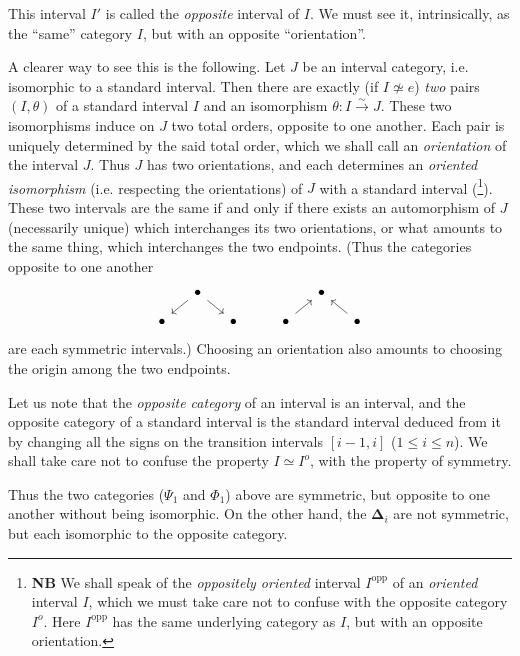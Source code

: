 \documentclass[11pt]{article}
\newcommand{\printedpage}[1]{\marginpar{\footnotesize p.~#1}}
\newcommand{\msp}[1]{\marginpar{\footnotesize [#1]}}
\newcommand{\bD}{\boldsymbol{\Delta}}
\begin{document}
This interval $I'$ is called the \textit{opposite} interval of $I$. We must see it, intrinsically, as the ``same'' category $I$, %
but with an opposite ``orientation''.

\msp{page 8}

A clearer way to see this is the following. Let $J$ be an interval category, i.e. isomorphic to a standard interval. Then there are exactly (if $I \not\simeq e$) \textit{two} pairs $(I,\theta)$ of a standard interval $I$ and an isomorphism $\theta : I \xrightarrow{\sim} J$. These two isomorphisms induce on $J$ two total orders, opposite to one another. Each pair is uniquely determined by the said total order, which we shall call %
an \textit{orientation} of the interval $J$. Thus $J$ has two orientations, and each determines an \textit{oriented isomorphism} (i.e. respecting
\printedpage{5}
the orientations) of $J$ with a standard interval (\footnote[2]{\textbf{NB} We shall speak of the \textit{oppositely oriented} interval $I^{\mathrm{opp}}$ of an \textit{oriented} interval $I$, which we must take care not to confuse with the opposite category $I^o$. Here $I^{\mathrm{opp}}$ has the same underlying category as $I$, but with an opposite orientation.}). These two intervals are the same if and only if there exists an automorphism of $J$ (necessarily unique) which interchanges its two orientations, or what amounts to the same thing, which interchanges the two endpoints. (Thus the categories opposite to one another
\[
\begin{tikzcd}[column sep=small, row sep=small]
 & \bullet \arrow[dl] \arrow[dr] & & & & \bullet & \\
 \bullet & & \bullet & & \bullet \arrow[ur] & & \bullet \arrow[ul]
\end{tikzcd}
\]
are each %
symmetric intervals.) Choosing an orientation also amounts to %
choosing the origin among the two endpoints.

Let us note that the \textit{opposite category} of an interval is an interval, and the opposite category of a standard interval is the standard interval deduced from it by changing all the signs on the transition intervals $[i-1,i]$ ($1 \leq i \leq n$). We shall take care not to confuse the property $I \simeq I^o$, with the property of symmetry.

\msp{page 9}

Thus the two categories ($\Psi_1$ and $\Phi_1$) above are symmetric, but opposite to one another without being isomorphic. On the other hand, the $\bD_i$ are not symmetric, but each isomorphic to the opposite category.
\end{document}
